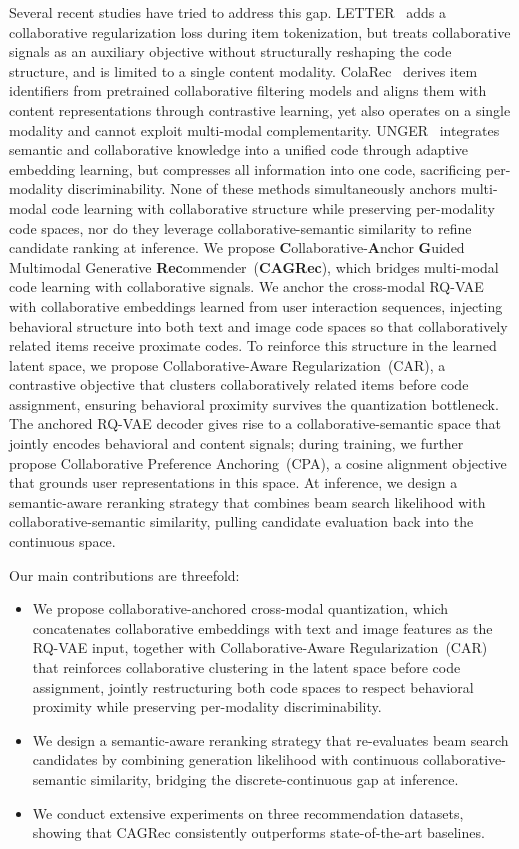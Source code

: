 \documentclass[sigconf, anonymous, review]{acmart}
\begin{document}
Several recent studies have tried to address this gap.
%
LETTER~\cite{letter} adds a collaborative regularization loss during item tokenization, but treats collaborative signals as an auxiliary objective without structurally reshaping the code structure, and is limited to a single content modality.
%
ColaRec~\cite{colarec} derives item identifiers from pretrained collaborative filtering models and aligns them with content representations through contrastive learning, yet also operates on a single modality and cannot exploit multi-modal complementarity.
%
UNGER~\cite{unger} integrates semantic and collaborative knowledge into a unified code through adaptive embedding learning, but compresses all information into one code, sacrificing per-modality discriminability.
%
None of these methods simultaneously anchors multi-modal code learning with collaborative structure while preserving per-modality code spaces, nor do they leverage collaborative-semantic similarity to refine candidate ranking at inference.
%
We propose \textbf{C}ollaborative-\textbf{A}nchor \textbf{G}uided Multimodal Generative \textbf{Rec}ommender~(\textbf{CAGRec}), which bridges multi-modal code learning with collaborative signals.
%
We anchor the cross-modal RQ-VAE with collaborative embeddings learned from user interaction sequences, injecting behavioral structure into both text and image code spaces so that collaboratively related items receive proximate codes.
%
To reinforce this structure in the learned latent space, we propose Collaborative-Aware Regularization~(CAR), a contrastive objective that clusters collaboratively related items before code assignment, ensuring behavioral proximity survives the quantization bottleneck.
%
The anchored RQ-VAE decoder gives rise to a collaborative-semantic space that jointly encodes behavioral and content signals; during training, we further propose Collaborative Preference Anchoring~(CPA), a cosine alignment objective that grounds user representations in this space.
%
At inference, we design a semantic-aware reranking strategy that combines beam search likelihood with collaborative-semantic similarity, pulling candidate evaluation back into the continuous space.

Our main contributions are threefold:
\begin{itemize}
    \item We propose collaborative-anchored cross-modal quantization, which concatenates collaborative embeddings with text and image features as the RQ-VAE input, together with Collaborative-Aware Regularization~(CAR) that reinforces collaborative clustering in the latent space before code assignment, jointly restructuring both code spaces to respect behavioral proximity while preserving per-modality discriminability.
    \item We design a semantic-aware reranking strategy that re-evaluates beam search candidates by combining generation likelihood with continuous collaborative-semantic similarity, bridging the discrete-continuous gap at inference.
    \item We conduct extensive experiments on three recommendation datasets, showing that CAGRec consistently outperforms state-of-the-art baselines.
\end{itemize}
\end{document}
